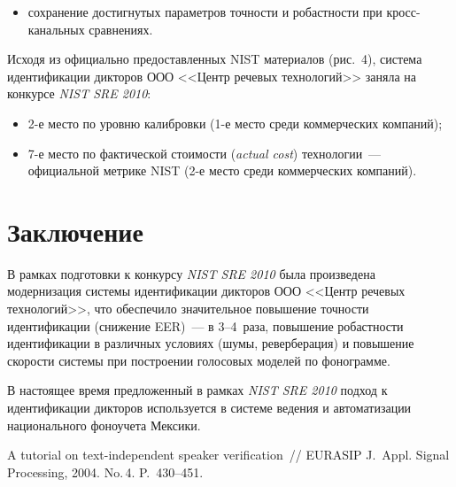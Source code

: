   \renewcommand{\figurename}{\protect\bf Рис.}
\renewcommand{\tablename}{\protect\bf Таблица}

\begin{multicols}{2}

\noindent
\begin{itemize}
\item сохранение достигнутых параметров точности и робастности при 
кросс-ка\-наль\-ных сравнениях.
\end{itemize}


  Исходя из официально предоставленных {NIST} материалов (рис.~4), 
система идентификации дикторов ООО <<Центр речевых технологий>> заняла на 
конкурсе \textit{NIST SRE 2010}:
  \begin{itemize}
\item 2-е место по уровню калибровки (1-е место среди коммерческих 
компаний);
\item 7-е место по фактической стоимости (\textit{actual cost}) технологии~--- 
официальной метрике {NIST} (2-е место среди коммерческих компаний).
\end{itemize}

  
\section{Заключение}

  В рамках подготовки к конкурсу \textit{NIST SRE 2010} была произведена 
модернизация системы идентификации дикторов ООО <<Центр речевых 
технологий>>, что обеспечило значительное повышение точности идентификации 
(снижение EER)~--- в 3--4~раза, повышение робастности идентификации в различных 
условиях (шумы, реверберация) и повышение скорости системы при построении 
голосовых моделей по фонограмме.
  
  В настоящее время предложенный в рамках \textit{NIST SRE 2010} подход к 
идентификации дикторов используется в системе ведения и автоматизации 
национального фоноучета Мексики.


{\small\frenchspacing
{%
\begin{thebibliography}{99}
  
  A tutorial on text-independent speaker verification~// EURASIP J.~Appl. Signal 
Processing, 2004. No.\,4. P.~430--451.
  

\end{thebibliography}}}
\end{multicols}
